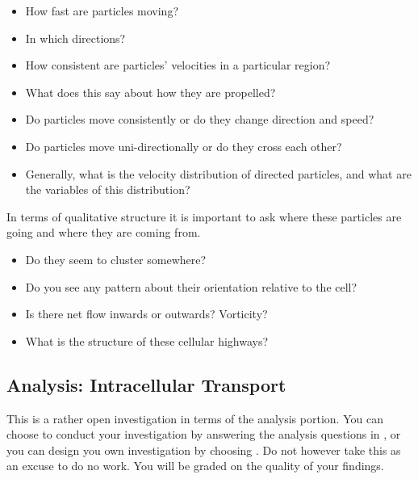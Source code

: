 \documentclass{../lab}
\begin{document}
\begin{itemize}
    \item How fast are particles moving?

    \item In which directions?

    \item How consistent are particles' velocities in a particular region?

    \item What does this say about how they are propelled?

    \item Do particles move consistently or do they change direction and speed?

    \item Do particles move uni-directionally or do they cross each other?

    \item Generally, what is the velocity distribution of directed particles, and what are the variables of this distribution?
\end{itemize}

In terms of qualitative structure it is important to ask where these particles are going and where they are coming from.

\begin{itemize}
    \item Do they seem to cluster somewhere?

    \item Do you see any pattern about their orientation relative to the cell?

    \item Is there net flow inwards or outwards? Vorticity?

    \item What is the structure of these cellular highways?
\end{itemize}



\subsection{Analysis: Intracellular Transport}

This is a rather open investigation in terms of the analysis portion. You can choose to conduct your investigation by answering the analysis questions in , or you can design you own investigation by choosing . Do not however take this as an excuse to do no work. You will be graded on the quality of your findings.
\end{document}
